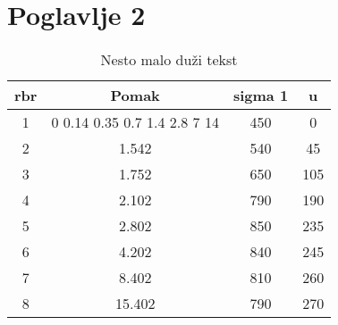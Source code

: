 \chapter{Poglavlje 2}


\lipsum[1-3]


\begin{table}
	\centering
	\caption{Nesto malo duži tekst}
	\label{tab:red}
	\begin{tabular}{c c c c}
		\hline
		rbr & Pomak & sigma 1 & u \\ \hline
		1 & 0 0.14 0.35 0.7 1.4 2.8 7 14 & 450 & 0 \\ \hline
		2 & 1.542 & 540 & 45 \\ \hline
		3 & 1.752 & 650 & 105 \\ \hline
		4 & 2.102 & 790 & 190 \\ \hline
		5 & 2.802 & 850 & 235 \\ \hline
		6 & 4.202 & 840 & 245 \\ \hline
		7 & 8.402 & 810 & 260 \\ \hline
		8 & 15.402 & 790 & 270 \\ \hline
	\end{tabular}
\end{table}


\lipsum[1-3] \cite{Massoudi2001}